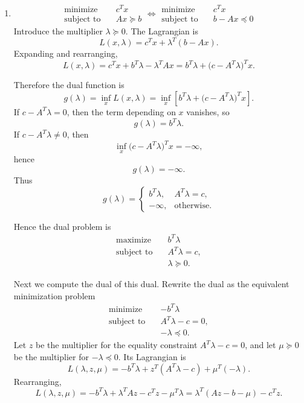 \documentclass[11pt,letter,notitlepage]{article}
\theoremstyle{definition}
\begin{document}
\begin{solution}
\leavevmode\vspace{-2em}

\begin{enumerate}
    \item[(a)]
    \[
    \begin{aligned}
        \text{minimize}\quad & c^T x\\
        \text{subject to}\quad & Ax \succeq b
    \end{aligned}
    \Longleftrightarrow
    \begin{aligned}
        \text{minimize}\quad & c^T x\\
        \text{subject to}\quad & b-Ax \preceq 0
    \end{aligned}
    \]
    Introduce the multiplier $\lambda \succeq 0$. The Lagrangian is
    \[
    L(x,\lambda)=c^T x+\lambda^T(b-Ax).
    \]
    Expanding and rearranging,
    \[
    L(x,\lambda)=c^T x+b^T\lambda-\lambda^T A x
    =b^T\lambda+\bigl(c-A^T\lambda\bigr)^T x.
    \]

    Therefore the dual function is
    \[
    g(\lambda)=\inf_x L(x,\lambda)
    =\inf_x\left[b^T\lambda+\bigl(c-A^T\lambda\bigr)^T x\right].
    \]
    If $c-A^T\lambda=0$, then the term depending on $x$ vanishes, so
    \[
    g(\lambda)=b^T\lambda.
    \]
    If $c-A^T\lambda\neq 0$, then
    \[
    \inf_x \bigl(c-A^T\lambda\bigr)^T x=-\infty,
    \]
    hence
    \[
    g(\lambda)=-\infty.
    \]
    Thus
    \[
    g(\lambda)=
    \begin{cases}
        b^T\lambda, & A^T\lambda=c,\\
        -\infty, & \text{otherwise}.
    \end{cases}
    \]

    Hence the dual problem is
    \[
    \begin{aligned}
        \text{maximize}\quad & b^T\lambda\\
        \text{subject to}\quad & A^T\lambda=c,\\
        & \lambda \succeq 0.
    \end{aligned}
    \]

    Next we compute the dual of this dual. Rewrite the dual as the
    equivalent minimization problem
    \[
    \begin{aligned}
        \text{minimize}\quad & -b^T\lambda\\
        \text{subject to}\quad & A^T\lambda-c=0,\\
        & -\lambda \preceq 0.
    \end{aligned}
    \]
    Let $z$ be the multiplier for the equality constraint
    $A^T\lambda-c=0$, and let $\mu \succeq 0$ be the multiplier for
    $-\lambda\preceq 0$. Its Lagrangian is
    \[
    L(\lambda,z,\mu)
    =-b^T\lambda+z^T(A^T\lambda-c)+\mu^T(-\lambda).
    \]
    Rearranging,
    \[
    L(\lambda,z,\mu)
    =-b^T\lambda+\lambda^T A z-c^T z-\mu^T\lambda
    =\lambda^T(Az-b-\mu)-c^T z.
    \]


\end{enumerate}
\end{solution}
\end{document}
